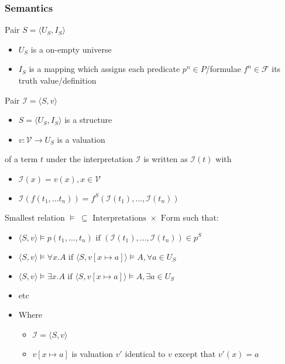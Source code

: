 \subsubsection{Semantics}
\begin{itemize}
     Pair $S = \langle U_S, I_S \rangle$
        \begin{itemize}
            \item $U_S$ is a on-empty universe
            \item $I_S$ is a mapping which assigns each predicate $p^n \in P$/formulae $f^n \in \mathcal{F}$ its truth value/definition
        \end{itemize}
     Pair $\mathcal{I} = \langle S, v \rangle$
        \begin{itemize}
            \item $S = \langle U_S, I_S \rangle$ is a structure
            \item $v : \mathcal{V} \to U_S$ is a valuation
        \end{itemize}
         of a term $t$ under the interpretation $\mathcal{I}$ is written as $\mathcal{I}(t)$ with
            \begin{itemize}
                \item $\mathcal{I}(x) = v(x), x \in \mathcal{V}$
                \item $\mathcal{I}(f(t_1, \dots t_n)) = f^S(\mathcal{I}(t_1), \dots , \mathcal{I}(t_n))$
            \end{itemize}
     Smallest relation $\models \ \subseteq \text{ Interpretations } \times \text{ Form}$ such that:
        \begin{itemize}
            \item $\langle S, v \rangle \models p(t_1, \dots , t_n) \text{ if } (\mathcal{I}(t_1), \dots , \mathcal{I}(t_n)) \in p^S$
            \item $\langle S, v \rangle \models \forall x. A \text{ if } \langle S, v[x \mapsto a] \rangle \models A, \forall a \in U_S$
            \item $\langle S, v \rangle \models \exists x. A \text{ if } \langle S, v[x \mapsto a] \rangle \models A, \exists a \in U_S$
            \item etc
            \item Where
                \begin{itemize}
                    \item $\mathcal{I} = \langle S, v \rangle$
                    \item $v[x \mapsto a]$ is valuation $v'$ identical to $v$ except that $v'(x) = a$

\end{itemize}
\end{itemize}
\end{itemize}
